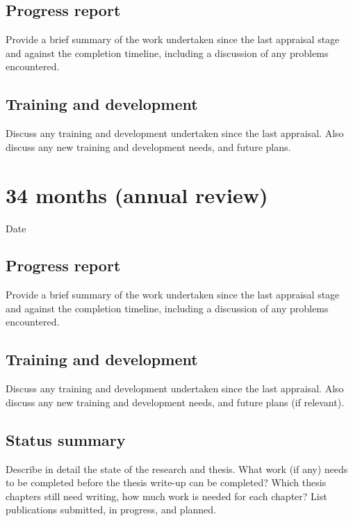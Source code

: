 \documentclass[12pt,a4paper]{article}
\begin{document}
\subsection{Progress report}
Provide a brief summary of the work undertaken since the last appraisal stage and against the completion timeline, including a discussion of any problems encountered. %

\subsection{Training and development}
Discuss any training and development undertaken since the last appraisal. Also discuss any new training and development needs, and future plans. %


\section{34 months (annual review)}

\begin{description}
	\item[Date] %
\end{description}

\subsection{Progress report}
Provide a brief summary of the work undertaken since the last appraisal stage and against the completion timeline, including a discussion of any problems encountered. %

\subsection{Training and development}
Discuss any training and development undertaken since the last appraisal. Also discuss any new training and development needs, and future plans (if relevant). %

\subsection{Status summary}
Describe in detail the state of the research and thesis. What work (if any) needs to be completed before the thesis write-up can be completed? Which thesis chapters still need writing, how much work is needed for each chapter? List publications submitted, in progress, and planned. %


\end{document}

